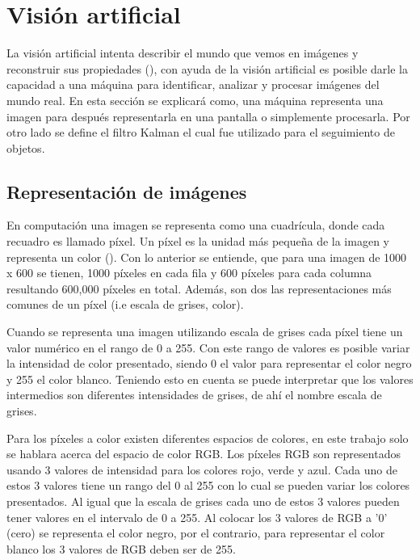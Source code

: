 \section{Visión artificial}

La visión artificial intenta describir el mundo que vemos en imágenes y reconstruir sus propiedades (\cite{szeliski2010computer}), con ayuda de la visión artificial es posible darle la capacidad a una máquina para identificar, analizar y procesar imágenes del mundo real. En esta sección se explicará como, una máquina representa una imagen para después representarla en una pantalla o simplemente procesarla. Por otro lado se define el filtro Kalman el cual fue utilizado para el seguimiento de objetos.

\subsection{Representación de imágenes}

En computación una imagen se representa como una cuadrícula, donde cada recuadro es llamado píxel. Un píxel es la unidad más pequeña de la imagen y representa un color (\cite{rosebrock2017deep}). Con lo anterior se entiende, que para una imagen de 1000 x 600 se tienen, 1000 píxeles en cada fila y 600 píxeles para cada columna resultando 600,000 píxeles en total. Además, son dos las representaciones más comunes de un píxel (i.e escala de grises, color).


Cuando se representa una imagen utilizando escala de grises cada píxel tiene un valor numérico en el rango de 0 a 255. Con este rango de valores es posible variar la intensidad de color presentado, siendo 0 el valor para representar el color negro y 255 el color blanco. Teniendo esto en cuenta se puede interpretar que los valores intermedios son diferentes intensidades de grises, de ahí el nombre escala de grises.

Para los píxeles a color existen diferentes espacios de colores, en este trabajo solo se hablara acerca del espacio de color RGB. Los píxeles RGB son representados usando 3 valores de intensidad para los colores rojo, verde y azul. Cada uno de estos 3 valores tiene un rango del 0 al 255 con lo cual se pueden variar los colores presentados. Al igual que la escala de grises cada uno de estos 3 valores pueden tener valores en el intervalo de 0 a 255. Al colocar los 3 valores de RGB a '0' (cero) se representa el color negro, por el contrario, para representar el color blanco los 3 valores de RGB deben ser de 255.

